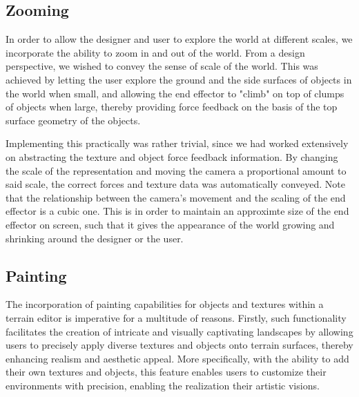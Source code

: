 \subsection{Zooming}
In order to allow the designer and user to explore the world at different scales, we incorporate the ability to zoom in and out of the world. From a design perspective, we wished to convey the sense of scale of the world. This was achieved by letting the user explore the ground and the side surfaces of objects in the world when small, and allowing the end effector to "climb" on top of clumps of objects when large, thereby providing force feedback on the basis of the top surface geometry of the objects. 

Implementing this practically was rather trivial, since we had worked extensively on abstracting the texture and object force feedback information. By changing the scale of the representation and moving the camera a proportional amount to said scale, the correct forces and texture data was automatically conveyed. Note that the relationship between the camera's movement and the scaling of the end effector is a cubic one. This is in order to maintain an approximte size of the end effector on screen, such that it gives the appearance of the world growing and shrinking around the designer or the user.

\subsection{Painting}
The incorporation of painting capabilities for objects and textures within a terrain editor is imperative for a multitude of reasons. 
Firstly, such functionality facilitates the creation of intricate and visually captivating landscapes by allowing users to precisely apply diverse textures and objects onto terrain surfaces, thereby enhancing realism and aesthetic appeal. 
More specifically, with the ability to add their own textures and objects, this feature enables users to customize their environments with precision, enabling the realization their artistic visions. 

